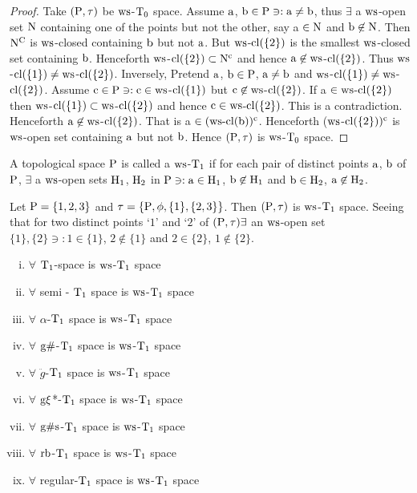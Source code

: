 \begin{proof}
Take $(\mathrm{P}, \tau)$ be $\mathrm{ws}$-$\mathrm{T}_{0}$ space. Assume $\mathrm{a}$, $\mathrm{b} \in \mathrm{P} \ni:\mathrm{a} \neq \mathrm{b}$, thus $\exists$ a $\mathrm{ws}$-open set $\mathrm{N}$ containing one of the points but not the other, say a $\in \mathrm{N}$ and $\mathrm{b} \not\in \mathrm{N}$. Then $\mathrm{N}^{\text{C}}$ is $\mathrm{ws}$-closed containing $\mathrm{b}$ but not $\mathrm{a}$. But $\mathrm{ws}$-$\mathrm{cl}(\{2\})$ is the smallest $\mathrm{ws}$-closed set containing $\mathrm{b}$. Henceforth $\mathrm{ws}$-$\mathrm{cl}(\{2\}) \subset \mathrm{N}^{\text{c}}$ and hence $\mathrm{a}\not\in \mathrm{ws}$-$\mathrm{cl}(\{2\})$. Thus $\mathrm{ws}$-$\mathrm{cl}(\{1\}) \neq \mathrm{ws}$-$\mathrm{cl}(\{2\})$. Inversely, Pretend $\mathrm{a}$, $\mathrm{b} \in \mathrm{P}$, $\mathrm{a}\neq \mathrm{b}$ and $\mathrm{ws}$-$\mathrm{cl}(\{1\}) \neq \mathrm{ws}$-$\mathrm{cl}(\{2\})$. Assume $\mathrm{c}\in \mathrm{P} \ni: \mathrm{c}\in \mathrm{ws}$-$\mathrm{cl}(\{1\})$ but $\mathrm{c} \not\in \mathrm{ws}$-$\mathrm{cl}(\{2\})$. If a $\in \mathrm{ws}$-$\mathrm{cl}(\{2\})$ then $\mathrm{ws}$-$\mathrm{cl}(\{1\}) \subset \mathrm{ws}$-$\mathrm{cl}(\{2\})$ and hence $\mathrm{c} \in \mathrm{ws}$-$\mathrm{cl}(\{2\})$. This is a contradiction. Henceforth $\mathrm{a}\not\in \mathrm{ws}$-$\mathrm{cl}(\{2\})$. That is a $\in (\mathrm{ws}\text{-}\mathrm{cl}(\mathrm{b}))^{\text{c}}$. Henceforth ($\mathrm{ws}$-$\mathrm{cl}(\{2\}))^{\text{c}}$ is $\mathrm{ws}$-open set containing $\mathrm{a}$ but not $\mathrm{b}$. Hence $(\mathrm{P}, \tau)$ is $\mathrm{ws}$-$\mathrm{T}_{0}$ space.
\end{proof}

\begin{dfn}\label{defi8.2.7}
A topological space $\mathrm{P}$ is called a $\mathrm{ws}$-$\mathrm{T}_{1}$ if for each pair of distinct points $\mathrm{a}$, $\mathrm{b}$ of $\mathrm{P}$, $\exists$ a $\mathrm{ws}$-open sets $\mathrm{H}_{1}$, $\mathrm{H}_{2}$ in $\mathrm{P} \ni: \mathrm{a} \in \mathrm{H}_{1}$, $\mathrm{b} \not\in \mathrm{H}_{1}$ and $\mathrm{b} \in \mathrm{H}_{2}$, $\mathrm{a} \not\in \mathrm{H}_{2}$.
\end{dfn}

\begin{exm}\label{exam8.2.8}
Let $\mathrm{P}= \{1, 2, 3\}$ and $\tau =\{\mathrm{P}, \phi, \{1\}, \{2, 3\}\}$. Then $(\mathrm{P}, \tau)$ is $\mathrm{ws}$-$\mathrm{T}_{1}$ space. Seeing that for two distinct points `$1$' and `$2$' of $(\mathrm{P}, \tau) \exists$ an $\mathrm{ws}$-open set $\{1\}, \{2\} \ni: 1 \in \{1\}$, $2 \not\in \{1\}$ and $2 \in \{2\}$, $1 \not\in \{2\}$.
\end{exm}

\begin{thm}\label{thm8.2.9}
\begin{enumerate}[(i)]
\item $\forall$ $\mathrm{T}_{1}$-space is $\mathrm{ws}$-$\mathrm{T}_{1}$ space
\item $\forall$ semi - $\mathrm{T}_{1}$ space is $\mathrm{ws}$-$\mathrm{T}_{1}$ space
\item $\forall$ $\alpha$-$\mathrm{T}_{1}$ space is $\mathrm{ws}$-$\mathrm{T}_{1}$ space
\item $\forall$ $\mathrm{g}\#$-$\mathrm{T}_{1}$ space is $\mathrm{ws}$-$\mathrm{T}_{1}$ space
\item $\forall$ $\ddot{g}$-$\mathrm{T}_{1}$ space is $\mathrm{ws}$-$\mathrm{T}_{1}$ space
\item $\forall$ $\mathrm{g}\xi$*-$\mathrm{T}_{1}$ space is $\mathrm{ws}$-$\mathrm{T}_{1}$ space
\item $\forall$ $\mathrm{g}\#\mathrm{s}$-$\mathrm{T}_{1}$ space is $\mathrm{ws}$-$\mathrm{T}_{1}$ space
\item $\forall$ $\mathrm{rb}$-$\mathrm{T}_{1}$ space is $\mathrm{ws}$-$\mathrm{T}_{1}$ space
\item $\forall$ regular-$\mathrm{T}_{1}$ space is $\mathrm{ws}$-$\mathrm{T}_{1}$ space
\end{enumerate}
\end{thm}

